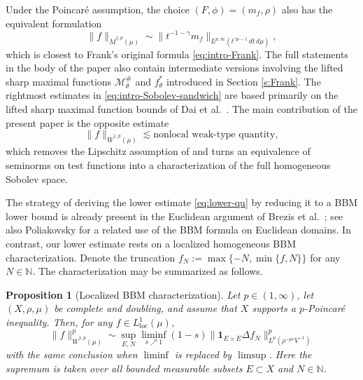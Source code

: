 \documentclass[11pt]{amsart}
\newtheorem{proposition}[theorem]{Proposition}
\theoremstyle{definition}
\theoremstyle{remark}
\numberwithin{equation}{section}
\begin{document}
Under the Poincar\'e assumption, the choice $(F,\phi)=(m_f,\rho)$ also has the
equivalent formulation
\begin{equation}\label{eq:intro-Frank-main}
 \|f\|_{\dot M^{1,p}(\mu)}
 \sim
 \|t^{-1-\gamma}m_f\|_{L^{p,\infty}(t^{\gamma p-1}\,dt\,d\mu)},
\end{equation}
which is closest to Frank's original formula \eqref{eq:intro-Frank}.
The full statements in the body
of the paper also contain intermediate versions involving the lifted sharp
maximal functions $\mathcal M_\theta^\#$ and $f_\theta^*$ introduced in
Section \ref{s:Frank}.
The rightmost estimates in \eqref{eq:intro-Sobolev-sandwich} are based
primarily on the lifted sharp maximal function bounds of Dai et al.\ \cite{DLYYZ}.
The main contribution of the
present paper is the opposite estimate
\begin{equation}\label{eq:lower-qu}
 \|f\|_{\dot W^{1,p}(\mu)}\lesssim \text{nonlocal weak-type quantity},
\end{equation}
which removes the Lipschitz assumption of
\cite{DLYYZ} and turns an equivalence of seminorms on
test functions into a characterization of the full homogeneous Sobolev space.

The strategy of deriving the lower estimate \eqref{eq:lower-qu}
by reducing it to
a BBM lower bound is already present in the Euclidean argument of Brezis et
al.\ \cite[Section~4]{BSVY}; see also
Poliakovsky \cite[Theorem~1.3 and Section~3]{Poliakovsky22} for a related use
of the BBM formula on Euclidean domains.  In contrast, our lower estimate rests on a
localized homogeneous BBM characterization.  Denote the truncation
$f_N:=\max\{-N,\min\{f,N\}\}$ for any $N\in\mathbb N$. The characterization may be
summarized as
follows.

\begin{proposition}[Localized BBM characterization]\label{prop:intro-BBM}
Let $p\in(1,\infty)$, let $(X,\rho,\mu)$ be complete and doubling, and assume
that $X$ supports a $p$-Poincar\'e inequality.  Then, for any
$f\in L^1_{\mathrm{loc}}(\mu)$,
\begin{equation}\label{eq:intro-local-BBM}
 \|f\|_{\dot W^{1,p}(\mu)}^p
 \sim
 \sup_{E,N}\liminf_{s\nearrow 1}(1-s)
 \|\mathbf{1}_{E\times E}\Delta f_N\|_{L^p(\rho^{-ps}V^{-1})}^p
\end{equation}
with the same conclusion when $\liminf$ is replaced by $\limsup$.  Here the
supremum is taken over all bounded measurable subsets $E\subset X$ and
$N\in\mathbb N$.
\end{proposition}
\end{document}
